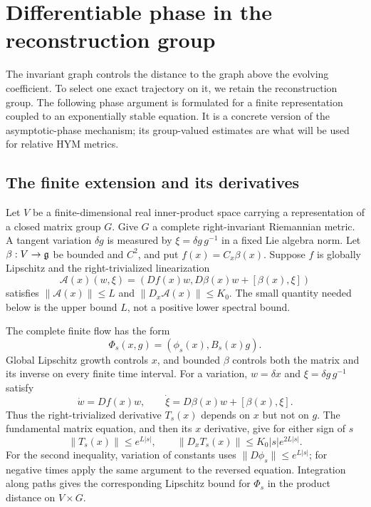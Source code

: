 \section{Differentiable phase in the reconstruction group}\label{sec:phase}

The invariant graph controls the distance to the graph above the
evolving coefficient. To select one exact trajectory on it, we
retain the reconstruction group. The following phase argument is
formulated for a finite representation coupled to an exponentially
stable equation. It is a concrete version of the asymptotic-phase
mechanism; its group-valued estimates are what will be used for
relative HYM metrics.

\subsection{The finite extension and its derivatives}
Let $V$ be a finite-dimensional real inner-product space carrying
a representation of a closed matrix group $G$. Give $G$ a
complete right-invariant Riemannian metric. A tangent variation
$\delta g$ is measured by $\xi=\delta g\,g^{-1}$ in a fixed
Lie algebra norm. Let $\beta:V\to\mathfrak g$ be bounded and $C^2$, and
put $f(x)=C_x\beta(x)$. Suppose $f$ is globally Lipschitz and
the right-trivialized linearization
\begin{equation}\label{eq:finite-linearization}
 \mathcal A(x)(w,\xi)
       =(Df(x)w,D\beta(x)w+[\beta(x),\xi])
\end{equation}
satisfies $\|\mathcal A(x)\|\le L$ and
$\|D_x\mathcal A(x)\|\le K_0$.
The small quantity needed below is the upper bound $L$,
not a positive lower spectral bound.

The complete finite flow has the form
\[
 \Phi_s(x,g)=(\phi_s(x),B_s(x)g).
\]
Global Lipschitz growth controls $x$, and bounded $\beta$
controls both the matrix and its inverse on every finite time
interval. For a variation, $w=\delta x$ and
$\xi=\delta g\,g^{-1}$ satisfy
\[
 \dot w=Df(x)w,\qquad
 \dot\xi=D\beta(x)w+[\beta(x),\xi].
\]
Thus the right-trivialized derivative $T_s(x)$ depends on $x$
but not on $g$. The fundamental matrix equation, and then its
$x$ derivative, give for either sign of $s$
\begin{equation}\label{eq:finite-derivatives}
 \|T_s(x)\|\le e^{L|s|},\qquad
 \|D_xT_s(x)\|\le K_0|s|e^{2L|s|}.
\end{equation}
For the second inequality, variation of constants uses
$\|D\phi_s\|\le e^{L|s|}$; for negative times apply the
same argument to the reversed equation. Integration along
paths gives the corresponding Lipschitz bound for $\Phi_s$
in the product distance on $V\times G$.

